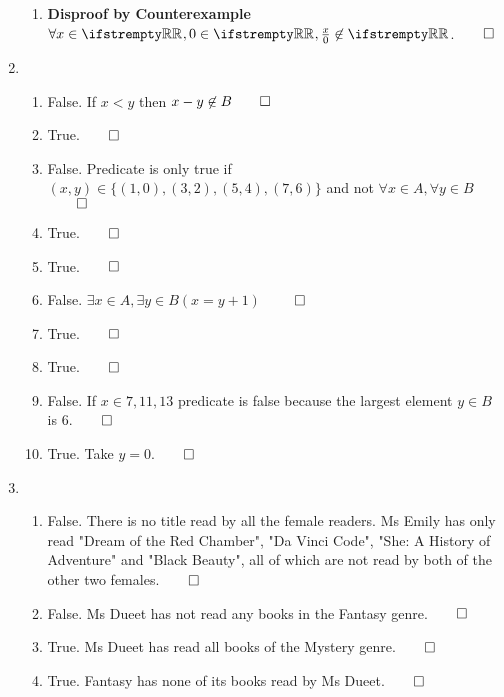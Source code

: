 \documentclass[12pt, a4paper]{article}
\begin{document}
\begin{enumerate}[Q\arabic*.]
\begin{enumerate}[(\alph*)]
    \item \textbf{Disproof by Counterexample}\\
      $\forall x \in \RR, 0\in \RR, \frac{x}{0} \not\in \RR$.$\qed$
  \end{enumerate}

\item 
  \begin{enumerate}[(\alph*)]
    \item False. If $x<y$ then $x-y\not\in B \qed$\\
    \item True.$\qed$
    \item False. Predicate is only true if $(x,y) \in \{(1,0), (3,2), (5, 4), (7, 6)\}$ and not $\forall x\in A, \forall y \in B$$\qed$
    \item True.$\qed$
    \item True.$\qed$
    \item False. $\exists x \in A, \exists y \in B (x = y + 1)$ $\qed$
    \item True.$\qed$
    \item True.$\qed$
    \item False. If $x \in {7, 11, 13}$ predicate is false because the largest element $y \in B$ is $6$.$\qed$
    \item True. Take $y = 0.$$\qed$
  \end{enumerate}

\item 
  \begin{enumerate}[(\alph*)]
    \item False. There is no title read by all the female readers. Ms Emily has only read "Dream of the Red Chamber", "Da Vinci Code", "She: A History of Adventure" and "Black Beauty", all of which are not read by both of the other two females.$\qed$

    \item False. Ms Dueet has not read any books in the Fantasy genre.$\qed$

    \item True. Ms Dueet has read all books of the Mystery genre.$\qed$

    \item True. Fantasy has none of its books read by Ms Dueet.$\qed$
  \end{enumerate}


\end{enumerate}
\end{document}
